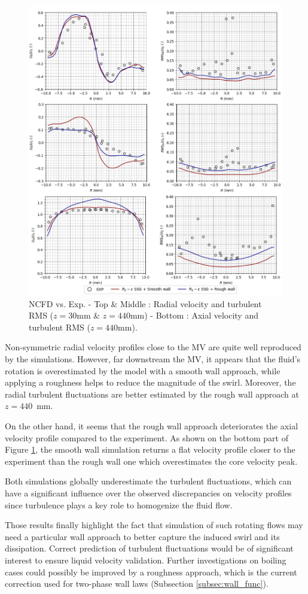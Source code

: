 %
\begin{figure}[!htb]
\centering
\includegraphics[scale=0.3]{img/AGATE/test.png}
\caption{NCFD vs. Exp. - Top \& Middle : Radial velocity and turbulent RMS ($z=30$mm \& $z=440$mm) -  Bottom : Axial velocity and turbulent RMS ($z=440$mm).}
\label{fig:agate1}
\end{figure}

Non-symmetric radial velocity profiles close to the MV are quite well reproduced by the simulations. However, far downstream the MV, it appears that the fluid's rotation is overestimated by the model with a smooth wall approach, while applying a roughness helps to reduce the magnitude of the swirl. Moreover, the radial turbulent fluctuations are better estimated by the rough wall approach at $z=440$~mm.

On the other hand, it seems that the rough wall approach deteriorates the axial velocity profile compared to the experiment. As shown on the bottom part of Figure \ref{fig:agate1}, the smooth wall simulation returns a flat velocity profile closer to the experiment than the rough wall one which overestimates the core velocity peak.

Both simulations globally underestimate the turbulent fluctuations, which can have a significant influence over the observed discrepancies on velocity profiles since turbulence plays a key role to homogenize the fluid flow. 

Those results finally highlight the fact that simulation of such rotating flows may need a particular wall approach to better capture the induced swirl and its dissipation. Correct prediction of turbulent fluctuations would be of significant interest to ensure liquid velocity validation. Further investigations on boiling cases could possibly be improved by a roughness approach, which is the current correction used for two-phase wall laws (Subsection \ref{subsec:wall_func}). 